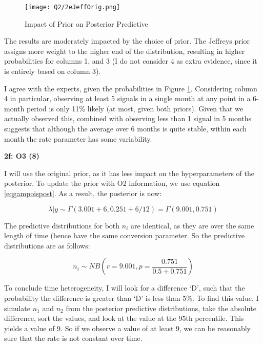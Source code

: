 \documentclass{article}
\begin{document}
\begin{figure}[!h]
\centering
\texttt{[image: Q2/2eJeffOrig.png]}
\caption{Impact of Prior on Posterior Predictive} \label{2eFigJeffOrig.png} \label{Fig2eJeffOrig}
\end{figure}

The results are moderately impacted by the choice of prior. The Jeffreys prior assigns more weight to the higher end of the distribution, resulting in higher probabilities for columns 1, and 3 (I do not consider 4 as extra evidence, since it is entirely based on column 3). 

I agree with the experts, given the probabilities in Figure \ref{Fig2eJeffOrig}. Considering column 4 in particular, observing at least 5 signals in a single month at any point in a 6-month period is only 11\% likely (at most, given both priors). Given that we actually observed this, combined with observing less than 1 signal in 5 months suggests that although the average over 6 months is quite stable, within each month the rate parameter has some variability. 



\textbf{2f: O3 (8)} \label{sec:2f}



I will use the original prior, as it has less impact on the hyperparameters of the posterior. To update the prior with O2 information, we use equation \eqref{eqgampoispost}. As a result, the posterior is now:

\begin{equation}
\lambda | y \sim \Gamma(3.001 + 6, 0.251 + 6/12) = \Gamma(9.001, 0.751)
\end{equation}

The predictive distributions for both $n_i$ are identical, as they are over the same length of time (hence have the same conversion parameter. So the predictive distributions are as follows:

\begin{equation}
n_i \sim NB\left(r= 9.001, p = \frac{0.751}{0.5 + 0.751}\right)
\end{equation}

To conclude time heterogeneity, I will look for a difference `D', such that the probability the difference is greater than `D' is less than 5\%. To find this value, I simulate $n_1$ and $n_2$ from the posterior predictive distributions, take the absolute difference, sort the values, and look at the value at the 95th percentile. This yields a value of 9. So if we observe a value of at least 9, we can be reasonably sure that the rate is not constant over time.  
\end{document}
